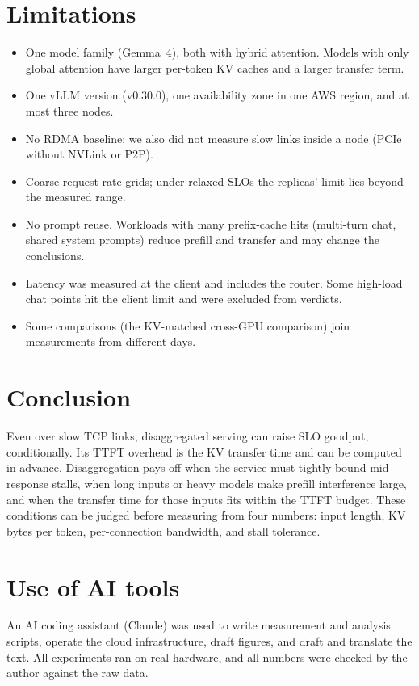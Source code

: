 \documentclass[11pt]{article}
\begin{document}
\section{Limitations}
\begin{itemize}
  \item One model family (Gemma~4), both with hybrid attention. Models with only global attention have larger per-token KV caches and a larger transfer term.
  \item One vLLM version (v0.30.0), one availability zone in one AWS region, and at most three nodes.
  \item No RDMA baseline; we also did not measure slow links inside a node (PCIe without NVLink or P2P).
  \item Coarse request-rate grids; under relaxed SLOs the replicas' limit lies beyond the measured range.
  \item No prompt reuse. Workloads with many prefix-cache hits (multi-turn chat, shared system prompts) reduce prefill and transfer and may change the conclusions.
  \item Latency was measured at the client and includes the router. Some high-load chat points hit the client limit and were excluded from verdicts.
  \item Some comparisons (the KV-matched cross-GPU comparison) join measurements from different days.
\end{itemize}

\section{Conclusion}
Even over slow TCP links, disaggregated serving can raise SLO goodput, conditionally. Its TTFT overhead is the KV transfer time and can be computed in advance. Disaggregation pays off when the service must tightly bound mid-response stalls, when long inputs or heavy models make prefill interference large, and when the transfer time for those inputs fits within the TTFT budget. These conditions can be judged before measuring from four numbers: input length, KV bytes per token, per-connection bandwidth, and stall tolerance.

\section*{Use of AI tools}
An AI coding assistant (Claude) was used to write measurement and analysis scripts, operate the cloud infrastructure, draft figures, and draft and translate the text. All experiments ran on real hardware, and all numbers were checked by the author against the raw data.
\end{document}
